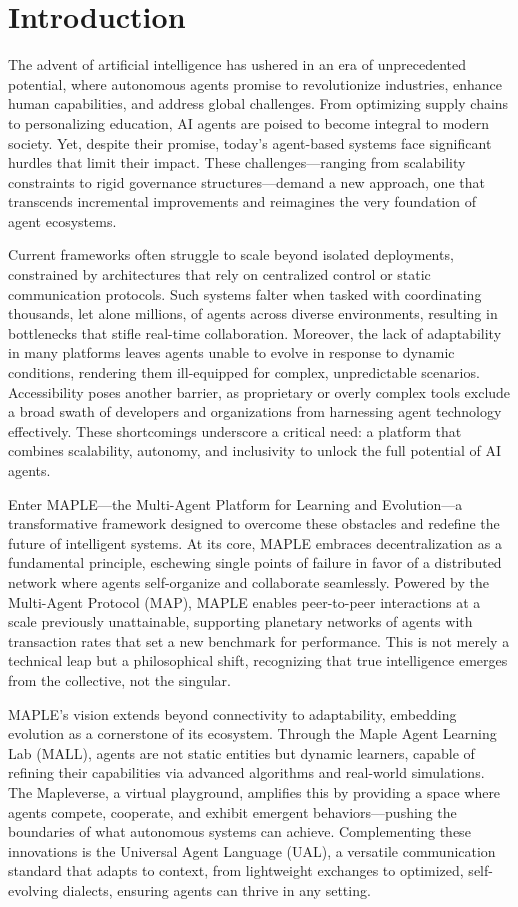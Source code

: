 \documentclass[a4paper,11pt]{article}
\begin{document}
\section{Introduction}
The advent of artificial intelligence has ushered in an era of unprecedented potential, where autonomous agents promise to revolutionize industries, enhance human capabilities, and address global challenges. From optimizing supply chains to personalizing education, AI agents are poised to become integral to modern society. Yet, despite their promise, today’s agent-based systems face significant hurdles that limit their impact. These challenges—ranging from scalability constraints to rigid governance structures—demand a new approach, one that transcends incremental improvements and reimagines the very foundation of agent ecosystems.

Current frameworks often struggle to scale beyond isolated deployments, constrained by architectures that rely on centralized control or static communication protocols. Such systems falter when tasked with coordinating thousands, let alone millions, of agents across diverse environments, resulting in bottlenecks that stifle real-time collaboration. Moreover, the lack of adaptability in many platforms leaves agents unable to evolve in response to dynamic conditions, rendering them ill-equipped for complex, unpredictable scenarios. Accessibility poses another barrier, as proprietary or overly complex tools exclude a broad swath of developers and organizations from harnessing agent technology effectively. These shortcomings underscore a critical need: a platform that combines scalability, autonomy, and inclusivity to unlock the full potential of AI agents.

Enter MAPLE—the Multi-Agent Platform for Learning and Evolution—a transformative framework designed to overcome these obstacles and redefine the future of intelligent systems. At its core, MAPLE embraces decentralization as a fundamental principle, eschewing single points of failure in favor of a distributed network where agents self-organize and collaborate seamlessly. Powered by the Multi-Agent Protocol (MAP), MAPLE enables peer-to-peer interactions at a scale previously unattainable, supporting planetary networks of agents with transaction rates that set a new benchmark for performance. This is not merely a technical leap but a philosophical shift, recognizing that true intelligence emerges from the collective, not the singular.

MAPLE’s vision extends beyond connectivity to adaptability, embedding evolution as a cornerstone of its ecosystem. Through the Maple Agent Learning Lab (MALL), agents are not static entities but dynamic learners, capable of refining their capabilities via advanced algorithms and real-world simulations. The Mapleverse, a virtual playground, amplifies this by providing a space where agents compete, cooperate, and exhibit emergent behaviors—pushing the boundaries of what autonomous systems can achieve. Complementing these innovations is the Universal Agent Language (UAL), a versatile communication standard that adapts to context, from lightweight exchanges to optimized, self-evolving dialects, ensuring agents can thrive in any setting.
\end{document}
